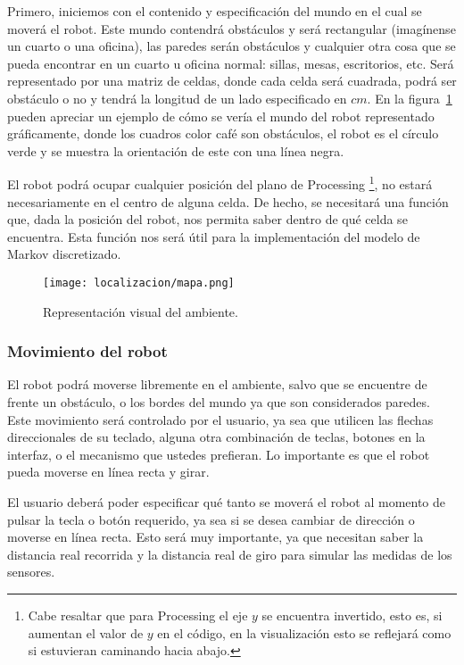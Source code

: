 \noindent Primero, iniciemos con el contenido y especificación del mundo en el cual se moverá el robot. Este mundo contendrá obstáculos y será rectangular (imagínense un cuarto o una oficina), las paredes serán obstáculos y cualquier otra cosa que se pueda encontrar en un cuarto u oficina normal: sillas, mesas, escritorios, etc. Será representado por una matriz de celdas, donde cada celda será cuadrada, podrá ser obstáculo o no y tendrá la longitud de un lado especificado en \(cm\). En la figura~\ref{fig:mapa} pueden apreciar un ejemplo de cómo se vería el mundo del robot representado gráficamente, donde los cuadros color café son obstáculos, el robot es el círculo verde y se muestra la orientación de este con una línea negra.

El robot podrá ocupar cualquier posición del plano de Processing \footnote{Cabe resaltar que para Processing el eje \(y\) se encuentra invertido, esto es, si aumentan el valor de \(y\) en el código, en la visualización esto se reflejará como si estuvieran caminando hacia abajo. }, no estará necesariamente en el centro de alguna celda. De hecho, se necesitará una función que, dada la posición del robot, nos permita saber dentro de qué celda se encuentra. Esta función nos será útil para la implementación del modelo de Markov discretizado.\par

\begin{figure}
  \centering
  \texttt{[image: localizacion/mapa.png]}
  \caption{Representación visual del ambiente.}
  \label{fig:mapa}
\end{figure}

\subsubsection{Movimiento del robot}

\noindent El robot podrá moverse libremente en el ambiente, salvo que se encuentre de frente un obstáculo, o los bordes del mundo ya que son considerados paredes. Este movimiento será controlado por el usuario, ya sea que utilicen las flechas direccionales de su teclado, alguna otra combinación de teclas, botones en la interfaz, o el mecanismo que ustedes prefieran. Lo importante es que el robot pueda moverse en línea recta y girar.\par

El usuario deberá poder especificar qué tanto se moverá el robot al momento de pulsar la tecla o botón requerido, ya sea si se desea cambiar de dirección o moverse en línea recta. Esto será muy importante, ya que necesitan saber la distancia real recorrida y la distancia real de giro para simular las medidas de los sensores.


